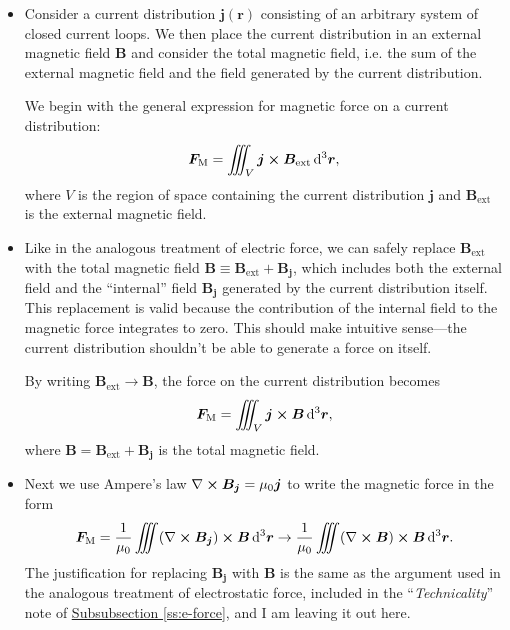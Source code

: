 \documentclass[11pt, a4paper]{article}
\newcommand{\diff}{\mathop{}\!\mathrm{d}} %
\newcommand{\dr}{\diff^{3} \r}  %
\renewcommand{\vec}[1]{\bm{#1}} %
\renewcommand{\r}{\vec{r}}
\newcommand{\B}{\vec{B}} %
\newcommand{\mm}{\mu_{0}}  %
\renewcommand{\j}{\vec{j}}  %
\renewcommand{\curl}{\nabla \cross}
\begin{document}
\begin{itemize}
	\item Consider a current distribution $ \j(\r) $ consisting of an arbitrary system of closed current loops. We then place the current distribution in an external magnetic field $ \B $ and consider the total magnetic field, i.e. the sum of the external magnetic field and the field generated by the current distribution. 
	
	We begin with the general expression for magnetic force on a current distribution:
	\begin{equation*}
		\vec{F}_{\text{M}} = \iiint_{V}\j \cross \B_{\text{ext}} \dr,
	\end{equation*}
	where $ V $ is the region of space containing the current distribution $ \j $ and $ \B_{\text{ext}} $ is the external magnetic field. 

    \item Like in the analogous treatment of electric force, we can safely replace $ \B_{\text{ext}} $ with the total magnetic field $ \B \equiv \B_{\text{ext}} + \B_{\j} $, which includes both the external field and the ``internal'' field $ \B_{\j} $ generated by the current distribution itself. This replacement is valid because the contribution of the internal field to the magnetic force integrates to zero. This should make intuitive sense---the current distribution shouldn't be able to generate a force on itself. 

    By writing $ \B_{\text{ext}} \to \B $, the force on the current distribution becomes
    \begin{equation*}
		\vec{F}_{\text{M}} = \iiint_{V}\j \cross \B \dr,
    \end{equation*}
    where $ \B = \B_{\text{ext}} + \B_{\j} $ is the total magnetic field.
    
    \item Next we use Ampere's law $ \curl \B_{\j} = \mm \j $ to write the magnetic force in the form
    \begin{equation*}
        \vec{F}_{\text{M}} = \frac{1}{\mm}\iiint (\curl \B_{\j}) \cross \B \dr \to \frac{1}{\mm}\iiint (\curl \B) \cross \B \dr.
    \end{equation*}
    The justification for replacing $ \B_{\j} $ with $ \B $ is the same as the argument used in the analogous treatment of electrostatic force, included in the ``\textit{Technicality}'' note of \hyperref[ss:e-force]{\underline{Subsubsection \ref{ss:e-force}}}, and I am leaving it out here.
    

\end{itemize}
\end{document}
